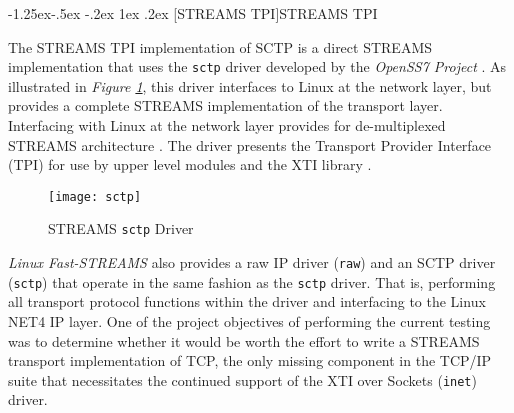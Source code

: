 \documentclass[letterpaper,final,notitlepage,twocolumn,10pt,twoside]{article}
\makeatletter
\renewcommand\subsubsection{\@startsection{subsubsection}{3}{\z@}%
                                     {-1.25ex\@plus -.5ex \@minus -.2ex}%
                                     {1ex \@plus .2ex}%
                                     {\normalfont\normalsize\bfseries}}
\renewcommand\paragraph{\@startsection{paragraph}{4}{\z@}%
                                    {1.5ex \@plus .5ex \@minus .2ex}%
                                    {-1em}%
                                    {\normalfont\normalsize\bfseries\slshape}}
\makeatother
\begin{document}

\subsubsection[STREAMS TPI]{STREAMS TPI}

The STREAMS TPI implementation of SCTP is a direct STREAMS implementation that
uses the \texttt{sctp} driver developed by the \textsl{OpenSS7 Project}
\cite[]{openss7}.  As illustrated in \textit{Figure \ref{figure:sctp}}, this
driver interfaces to Linux at the network layer, but provides a complete
STREAMS implementation of the transport layer.  Interfacing with Linux at the
network layer provides for de-multiplexed STREAMS architecture \cite[]{demux}.
The driver presents the Transport Provider Interface (TPI) \cite[]{tpi} for
use by upper level modules and the XTI library \cite[]{xti}.

\begin{figure}[htp]
\center\texttt{[image: sctp]}
\caption[STREAMS \texttt{sctp} Driver]{STREAMS \texttt{sctp} Driver}
\label{figure:sctp}
\end{figure}

\textsl{Linux Fast-STREAMS} also provides a raw IP driver (\texttt{raw}) and
an SCTP driver (\texttt{sctp}) that operate in the same fashion as the
\texttt{sctp} driver.  That is, performing all transport protocol functions
within the driver and interfacing to the Linux NET4 IP layer.  One of the
project objectives of performing the current testing was to determine whether
it would be worth the effort to write a STREAMS transport implementation of
TCP, the only missing component in the TCP/IP suite that necessitates the
continued support of the XTI over Sockets (\texttt{inet}) driver.
\end{document}
